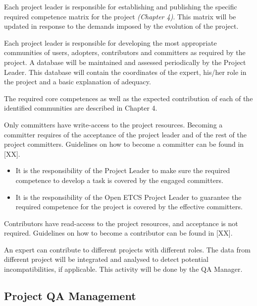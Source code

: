 \documentclass{template/openetcs_article}
\begin{document}
Each project leader is responsible for establishing and publishing the specific required competence matrix for the project \textit{(Chapter 4)}. This matrix will be updated in response to the demands imposed by the evolution of the project.

Each project leader is responsible for developing the most appropriate communities of users, adopters, contributors and committers as required by the project. A database will be maintained and assessed periodically by the Project Leader. This database will contain the coordinates of the expert, his/her role in the project and a basic explanation of adequacy.

The required core competences as well as the expected contribution of each of the identified communities are described in Chapter 4.

Only committers have write-access to the project resources. Becoming a committer requires of the acceptance of the project leader and of the rest of the project committers. Guidelines on how to become a committer can be found in [XX].

\begin{itemize}
\item It is the responsibility of the Project Leader to make sure the required competence to develop a task is covered by the engaged committers.
\item It is the responsibility of the Open ETCS Project Leader to guarantee the required competence for the project is covered by the effective committers.
\end{itemize}

Contributors have read-access to the project resources, and acceptance is not required. Guidelines on how to become a contributor can be found in [XX].

An expert can contribute to different projects with different roles. The data from different project will be integrated and analysed to detect potential incompatibilities, if applicable. This activity will be done by the QA Manager. 


\subsection{Project QA Management}
\end{document}
